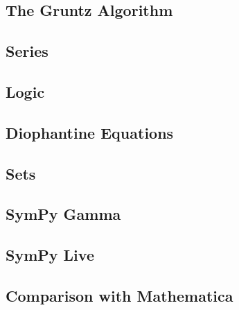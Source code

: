 \subsection{The Gruntz Algorithm}



\subsection{Series}



\subsection{Logic}



\subsection{Diophantine Equations}



\subsection{Sets}


\subsection{SymPy Gamma}\label{sympy-gamma}



\subsection{SymPy Live}\label{sympy-live}



\subsection{Comparison with Mathematica}


